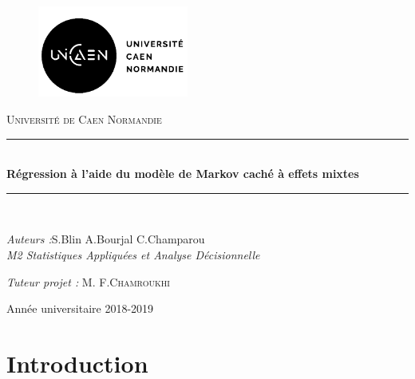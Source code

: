 \documentclass[11pt]{article}
\newcommand{\HRule}{\rule{\linewidth}{0.5mm}}
\begin{document}
\begin{titlepage}
\begin{center}
	\begin{figure}
		\begin{minipage}[c]{.46\linewidth}
      			\begin{flushleft}		
			\includegraphics[height=3cm]{unicaen.png}
	  		\end{flushleft}
    		\end{minipage}
		
    \end{figure}
    \textsc{\LARGE Université de Caen Normandie}\\[5cm]
    
    \HRule \\[0.4cm]
    { \huge \bfseries Régression à l'aide du modèle de Markov caché à effets mixtes }

    \HRule \\[7.5cm]


    
    \begin{minipage}{0.4\textwidth}
      \begin{flushleft} \large
        \emph{Auteurs :}S.Blin A.Bourjal C.Champarou\\
        \emph{M2 Statistiques Appliquées et Analyse Décisionnelle}
      \end{flushleft}
    \end{minipage}
    \begin{minipage}{0.4\textwidth}
      \begin{flushright} \large
        \emph{Tuteur projet :} M. \textsc{F.Chamroukhi}\\
      \end{flushright}
    \end{minipage}

    \vfill

    Année universitaire 2018-2019


\end{center}
\end{titlepage}

\newpage
\section*{Introduction}
\end{document}

